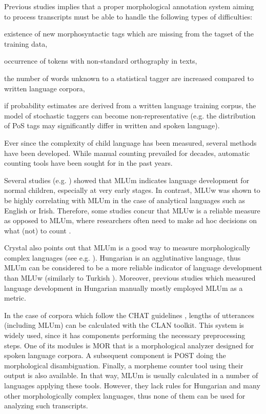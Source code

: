Previous studies implies that a proper morphological annotation system aiming to process transcripts must be able to handle the following types of difficulties:
\begin{inparaenum}
 \item existence of new morphosyntactic tags which are missing from the tagset of the training data,
 \item occurrence of tokens with non-standard orthography in texts,
 \item the number of words unknown to a statistical tagger are increased compared to written language corpora,
 \item if probability estimates are derived from a written language training corpus, the model of stochastic taggers can become non-representative (e.g. the distribution of PoS tags may significantly differ in written and spoken language).
\end{inparaenum}

Ever since the complexity of child language has been measured, several methods have been developed. While manual counting prevailed for decades, automatic counting tools have been sought for in the past years.

Several studies (e.g. \cite{Brown1973}) showed that MLUm indicates language development for normal children, especially at very early stages. 
In contrast, MLUw was shown to be highly correlating \cite{Hickey1991,Parker2005} with MLUm in the case of analytical languages such as English or Irish. 
Therefore, some studies concur that MLUw is a reliable measure as opposed to MLUm, where researchers often need to make ad hoc decisions on what (not) to count \cite{Crystal1974}. 

Crystal also points out \cite{Crystal1974} that MLUm is a good way to measure morphologically complex languages (see e.g. \cite{Bowerman1973}). 
Hungarian is an agglutinative language, thus MLUm can be considered to be a more reliable indicator of language development  than MLUw (similarly to Turkish \cite{saygin2010}). 
Moreover, previous studies which measured language development in Hungarian manually \cite{Reger1990,Weber2011} mostly employed MLUm as a metric.

In the case of corpora which follow the CHAT guidelines \cite{macwhinney1991childes}, lengths of utterances (including MLUm) can be calculated with the CLAN \cite{MacWhinney1992} toolkit. 
This system is widely used, since it has components performing the necessary preprocessing steps. 
One of its modules is MOR that is a morphological analyzer designed for spoken language corpora. 
A subsequent component is POST doing the morphological disambiguation. 
Finally, a morpheme counter tool using their output is also available. 
In that way, MLUm is usually calculated in a number of languages applying these tools.
However, they lack rules for Hungarian and many other morphologically complex languages, thus none of them can be used for analyzing such transcripts.

